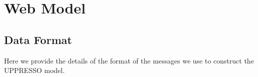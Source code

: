 \appendix

\renewcommand{\algorithmicrequire}{\textbf{Input:}}
\newcommand{\deflet}{\textbf{let}}
\newcommand{\mystate}[1]{\STATE \textbf{let} {{}#1}}
\newcommand{\mystop}[1]{\STATE \textbf{stop} \myss{\myangle{{{}#1}}, s'}}
\newcommand{\myss}[1]{${{}#1}$}
\newcommand{\myangle}[1]{\langle {{}#1} \rangle}
\newcommand{\myif}[1]{\IF{\myss{{{}#1}}}}
\newcommand{\myelse}[1]{\ELSIF{\myss{{{}#1}}}}

\newcommand{\SWITCH}[1]{\STATE \textbf{switch} #1\ \textbf{do} \begin{ALC@g}}
\newcommand{\ENDSWITCH}{\end{ALC@g}\STATE \textbf{end switch}}
\newcommand{\CASE}[1]{\STATE \textbf{case} #1\textbf{:} \begin{ALC@g}}
\newcommand{\ENDCASE}{\end{ALC@g}}
\newcommand{\CASELINE}[1]{\STATE \textbf{case} #1\textbf{:} }
\newcommand{\DEFAULT}{\STATE \textbf{default:} \begin{ALC@g}}
\newcommand{\ENDDEFAULT}{\end{ALC@g}}
\newcommand{\DEFAULTLINE}[1]{\STATE \textbf{default:} }

\section{Web Model}
\label{ape:model}

\subsection{Data Format}
Here we provide the details of the format of the messages we use to construct the UPPRESSO model.

